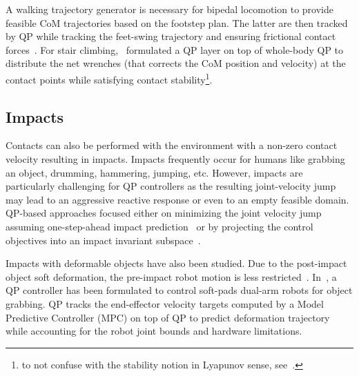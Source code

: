 


A walking trajectory generator is necessary for bipedal locomotion to provide feasible CoM trajectories based on the footstep plan. The latter are then tracked by QP while tracking the feet-swing trajectory and ensuring frictional contact forces~\cite{englsberger2018icra,koolen2016ijhr,kuindersma2016autonomousRobot}.   
For stair climbing,~\cite{caron2019icra,kheddar2019ram} formulated a QP layer on top of whole-body QP to distribute the net wrenches (that corrects the CoM position and velocity) at the contact points while satisfying contact stability\footnote{to not confuse with the stability notion in Lyapunov sense, see~\cite{caron2017tro}.}. 
\subsection{Impacts}
Contacts can also be performed with the environment with a non-zero contact velocity resulting in impacts. Impacts frequently occur for humans like grabbing an object, drumming, hammering, jumping, etc. However, impacts are particularly challenging for QP controllers as the resulting joint-velocity jump may lead to an aggressive reactive response or even to an empty feasible domain. QP-based approaches focused either on minimizing the joint velocity jump assuming one-step-ahead impact prediction~\cite{wang2019rss} or by projecting the control objectives into an impact invariant subspace~\cite{yang2021iros}. 

Impacts with deformable objects have also been studied. Due to the post-impact object soft deformation, the pre-impact robot motion is less restricted~\cite{dehio2021icra}. In~\cite{dehio2022ral}, a QP controller has been formulated to control soft-pads dual-arm robots for object grabbing. QP tracks the end-effector velocity targets computed by a Model Predictive Controller (MPC) on top of QP to predict deformation trajectory while accounting for the robot joint bounds and hardware limitations. 

